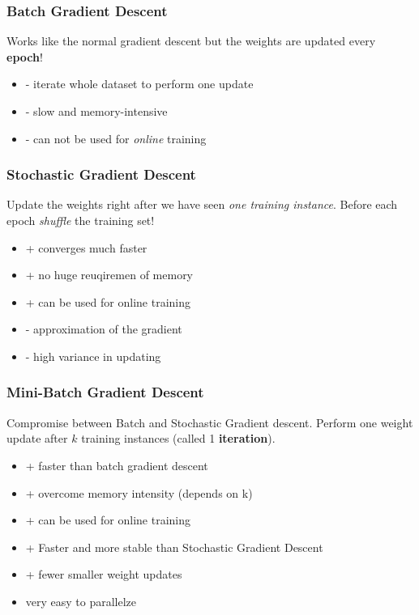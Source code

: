 \subsubsection{Batch Gradient Descent}
\label{sssect:batch-gradient-descent}
Works like the normal gradient descent but the weights are updated every \textbf{epoch}!
\begin{itemize}
	\item - iterate whole dataset to perform one update
	\item - slow and memory-intensive
	\item - can not be used for \textit{online} training
\end{itemize}

\subsubsection{Stochastic Gradient Descent}
\label{sssect:stochastic-gradient-descent}
Update the weights right after we have seen \textit{one training instance}. Before each epoch \textit{shuffle} the training set!
\begin{itemize}
	\item + converges much faster
	\item + no huge reuqiremen of memory
	\item + can be used for online training
	\item - approximation of the gradient
	\item - high variance in updating
\end{itemize}

\subsubsection{Mini-Batch Gradient Descent}
\label{sssect:mini-batch-gradient-descent}
Compromise between Batch and Stochastic Gradient descent. Perform one weight update after $k$ training instances (called 1 \textbf{iteration}).
\begin{itemize}
	\item + faster than batch gradient descent
	\item + overcome memory intensity (depends on k)
	\item + can be used for online training
	\item + Faster and more stable than Stochastic Gradient Descent
	\item + fewer smaller weight updates
	\item very easy to parallelze
\end{itemize}

